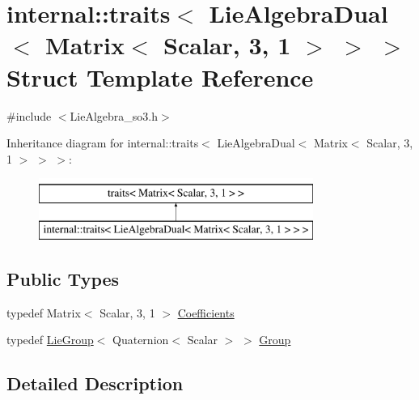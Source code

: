 \hypertarget{structinternal_1_1traits_3_01_lie_algebra_dual_3_01_matrix_3_01_scalar_00_013_00_011_01_4_01_4_01_4}{}\section{internal\+:\+:traits$<$ Lie\+Algebra\+Dual$<$ Matrix$<$ Scalar, 3, 1 $>$ $>$ $>$ Struct Template Reference}
\label{structinternal_1_1traits_3_01_lie_algebra_dual_3_01_matrix_3_01_scalar_00_013_00_011_01_4_01_4_01_4}


{\ttfamily \#include $<$Lie\+Algebra\+\_\+so3.\+h$>$}

Inheritance diagram for internal\+:\+:traits$<$ Lie\+Algebra\+Dual$<$ Matrix$<$ Scalar, 3, 1 $>$ $>$ $>$\+:\begin{figure}[H]
\begin{center}
\leavevmode
\includegraphics[height=2.000000cm]{structinternal_1_1traits_3_01_lie_algebra_dual_3_01_matrix_3_01_scalar_00_013_00_011_01_4_01_4_01_4}
\end{center}
\end{figure}
\subsection*{Public Types}
\begin{DoxyCompactItemize}
\item 
typedef Matrix$<$ Scalar, 3, 1 $>$ \hyperlink{structinternal_1_1traits_3_01_lie_algebra_dual_3_01_matrix_3_01_scalar_00_013_00_011_01_4_01_4_01_4_a80495946885356581543f8de93844103}{Coefficients}
\item 
typedef \hyperlink{class_lie_group}{Lie\+Group}$<$ Quaternion$<$ Scalar $>$ $>$ \hyperlink{structinternal_1_1traits_3_01_lie_algebra_dual_3_01_matrix_3_01_scalar_00_013_00_011_01_4_01_4_01_4_a05cfaae13397aaf0d8ece656959c0bfb}{Group}
\end{DoxyCompactItemize}


\subsection{Detailed Description}
